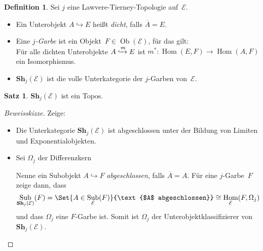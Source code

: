\documentclass{article}
\theoremstyle{definition}
\newtheorem*{defn}{Definition}
\newtheorem*{satz}{Satz}
\theoremstyle{remark}
\DeclareMathOperator{\Ob}{Ob} %
\DeclareMathOperator{\Hom}{Hom} %
\DeclareMathOperator{\id}{id} %
\DeclareMathOperator{\Sub}{Sub} %
\newcommand{\clos}[1]{\overline{{#1}}} %
\newcommand{\Sh}{\mathbf{Sh}} %
\newcommand{\Eat}{\mathcal{E}} %
\begin{document}
\begin{defn}
  Sei $j$ eine Lawvere-Tierney-Topologie auf~$\Eat$.
  \begin{itemize}[itemsep=0pt]
    \item Ein Unterobjekt $A \hookrightarrow E$ heißt \emph{dicht}, falls $\clos{A} = E$.
    \item
      Eine \emph{$j$-Garbe} ist ein Objekt~$F \in \Ob(\Eat)$, für das gilt: \\
      Für alle dichten Unterobjekte $A \xhookrightarrow{m} E$ ist $m^* : \Hom(E, F) \to \Hom(A, F)$ ein Isomorphismus.
    \item $\Sh_j(\Eat)$ ist die volle Unterkategorie der $j$-Garben von~$\Eat$.
  \end{itemize}
\end{defn}

\begin{satz}
  $\Sh_j(\Eat)$ ist ein Topos.
\end{satz}

\begin{proof}[Beweisskizze]
  Zeige:
  \begin{itemize}
    \item Die Unterkategorie $\Sh_j(\Eat)$ ist abgeschlossen unter der Bildung von Limiten und Exponentialobjekten.
    \item
      Sei $\Omega_j$ der Differenzkern


      Nenne ein Subobjekt $A \hookrightarrow F$ \emph{abgeschlossen}, falls $\clos{A} = A$.
      Für eine $j$-Garbe~$F$ zeige dann, dass
      \[
        \Sub_{\Sh_j(\Eat)}(F) =
        \Set{A \in \Sub_\Eat(F)}{\text{$A$ abgeschlossen}} \cong
        \Hom_\Eat(F, \Omega_j)
      \]
      und dass $\Omega_j$ eine $F$-Garbe ist.
      Somit ist $\Omega_j$ der Unterobjektklassifizierer von~$\Sh_j(\Eat)$. \qedhere
  \end{itemize}
\end{proof}
\end{document}
